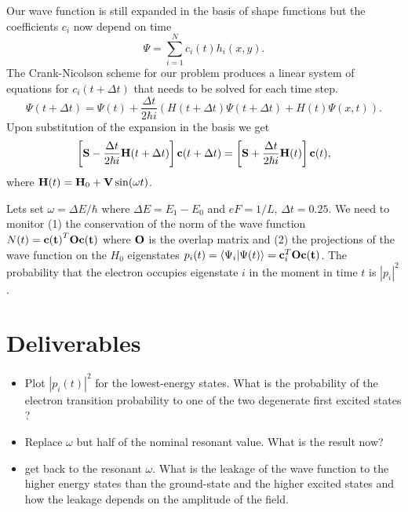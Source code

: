 \documentclass[7pt]{article}
\begin{document}
Our wave function is still expanded in the basis of shape functions but the coefficients $c_i$ now depend on time
   \begin{equation} \Psi=\sum_{i=1}^N c_i(t) h_i(x,y).\end{equation} 
The Crank-Nicolson scheme for our problem produces a linear system of equations for $c_i(t+\Delta t)$ that needs to be solved for each time step.
\begin{equation}
\Psi(t+\Delta t)=\Psi(t)+\frac{\Delta t}{2\hbar i} \left(H(t+\Delta t)\Psi(t+\Delta t)+H(t)\Psi(x,t)\right).
\end{equation}
Upon substitution of the expansion in the basis we get 
{
\begin{equation}
\left[{\bf S}-\frac{\Delta t}{2\hbar i} {\bf H}(t+\Delta t)\right]{\bf c}(t+\Delta t)=\left[{\bf S}+\frac{\Delta t}{2\hbar i}{\bf H}(t)\right]{\bf c}(t),
\end{equation}
}
where ${\bf H}(t)={\bf H}_0+{\bf V} \sin(\omega t)$.

Lets set $\omega=\Delta E/\hbar$ where $\Delta E=E_1-E_0$ and $eF=1/L$, $\Delta t=0.25$.
We need to monitor (1) the conservation of the norm of the wave function
$N(t)={\bf c(t)}^T {\bf O} {\bf c(t)}$ where ${\bf O}$ is the overlap matrix
and (2) 
the projections of the wave function on the $H_0$ eigenstates
$p_i(t)=\langle \Psi_i | \Psi(t)\rangle={\bf c}_i^T {\bf O} {\bf c(t)}$.
The probability that the electron occupies eigenstate $i$ in the moment in time $t$ is $|p_i|^2$.

\section{Deliverables}
\begin{itemize}
\item Plot $|p_i(t)|^2$ for the lowest-energy states. What is the probability of the electron transition probability to one of the two degenerate first
excited states ?
\item Replace $\omega$ but half of the nominal resonant value. What is the result now? 
\item get back to the resonant $\omega$. What is the leakage of the wave function to the higher energy states
than the ground-state and the higher excited states and how the leakage depends on the amplitude of the field.
\end{itemize}
\end{document}
